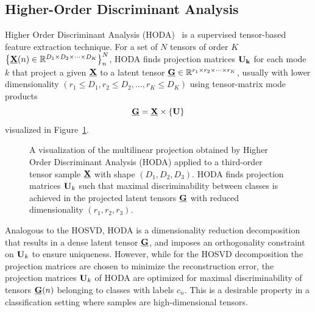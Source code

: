 \documentclass[twocolumn]{article}
\begin{document}
\subsection{Higher-Order Discriminant Analysis}
Higher Order Discriminant Analysis (\textsc{HODA})~\cite{Phan2010} is a
supervised tensor-based feature extraction technique.
For a set of $N$ tensors of order $K$
$\left\{\underline{\mathbf{X}}(n)\in\mathbb{R}^{D_1\times D_2 \times \cdots \times
		D_K}\right\}_n^N$, \textsc{HODA} finds projection matrices $\mathbf{U_k}$ for each mode $k$
that project a given $\underline{\mathbf{X}}$ to a latent tensor
$\underline{\mathbf{G}}\in\mathbb{R}^{r_1\times r_2\times\cdots\times r_K}$, usually with lower
dimensionality $(r_1\leq D_1,r_2\leq D_2,\ldots,r_K\leq D_K)$ using
tensor-matrix mode products
\begin{equation}
	\underline{\mathbf{G}}  = \underline{\mathbf{X}}\times\left\{\mathbf{U}\right\}
	\label{eq:HODA-backward}
\end{equation}
visualized in Figure~\ref{fig:HODA-backward}.
\begin{figure}[t]
	\centering
	
	\caption{A visualization of the multilinear projection obtained by Higher Order
    Discriminant Analysis (\textsc{HODA}) applied to a third-order tensor
    sample $\underline{\mathbf{X}}$ with shape $(D_1,D_2, D_3)$.
		\textsc{HODA} finds projection matrices $\mathbf{U}_k$ such that maximal
		discriminability between classes is achieved in the projected latent tensors
		$\underline{\mathbf{G}}$ with reduced dimensionality $(r_1,r_2,r_3)$.}
	\label{fig:HODA-backward}
\end{figure}
Analogous to the \textsc{HOSVD}, \textsc{HODA} is a dimensionality
reduction decomposition that results in a dense latent tensor $\underline{\mathbf{G}}$, and
imposes an orthogonality constraint on $\mathbf{U}_k$ to ensure uniqueness.
However, while for the \textsc{HOSVD} decomposition the projection matrices
are chosen to minimize the reconstruction error, the projection matrices
$\mathbf{U}_k$ of \textsc{HODA} are optimized for maximal discriminability of tensors
$\underline{\mathbf{G}}(n)$ belonging to classes with labels $c_n$.
This is a desirable property in a classification setting where samples are
high-dimensional tensors.
\end{document}

